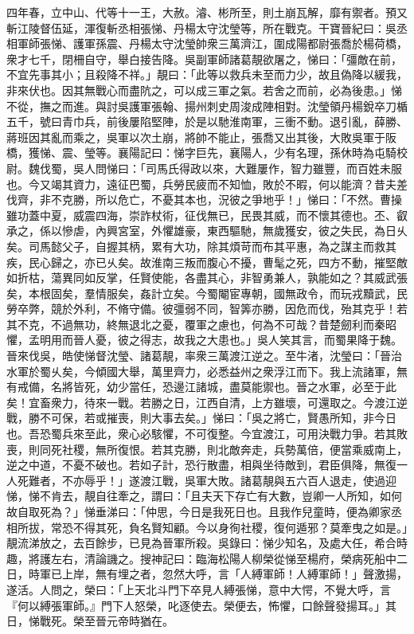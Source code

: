 \begin{pinyinscope}
四年春，立中山、代等十一王，大赦。濬、彬所至，則土崩瓦解，靡有禦者。預又斬江陵督伍延，渾復斬丞相張悌、丹楊太守沈瑩等，所在戰克。干寶晉紀曰：吳丞相軍師張悌、護軍孫震、丹楊太守沈瑩帥衆三萬濟江，圍成陽都尉張喬於楊荷橋，衆才七千，閉柵自守，舉白接告降。吳副軍師諸葛靚欲屠之，悌曰：「彊敵在前，不宜先事其小；且殺降不祥。」靚曰：「此等以救兵未至而力少，故且偽降以緩我，非來伏也。因其無戰心而盡阬之，可以成三軍之氣。若舍之而前，必為後患。」悌不從，撫之而進。與討吳護軍張翰、揚州刺史周浚成陣相對。沈瑩領丹楊銳卒刀楯五千，號曰青巾兵，前後屢陷堅陣，於是以馳淮南軍，三衝不動。退引亂，薛勝、蔣班因其亂而乘之，吳軍以次土崩，將帥不能止，張喬又出其後，大敗吳軍于阪橋，獲悌、震、瑩等。襄陽記曰：悌字巨先，襄陽人，少有名理，孫休時為屯騎校尉。魏伐蜀，吳人問悌曰：「司馬氏得政以來，大難屢作，智力雖豐，而百姓未服也。今又竭其資力，遠征巴蜀，兵勞民疲而不知恤，敗於不暇，何以能濟？昔夫差伐齊，非不克勝，所以危亡，不憂其本也，況彼之爭地乎！」悌曰：「不然。曹操雖功蓋中夏，威震四海，崇詐杖術，征伐無已，民畏其威，而不懷其德也。丕、叡承之，係以慘虐，內興宮室，外懼雄豪，東西驅馳，無歲獲安，彼之失民，為日乆矣。司馬懿父子，自握其柄，累有大功，除其煩苛而布其平惠，為之謀主而救其疾，民心歸之，亦已乆矣。故淮南三叛而腹心不擾，曹髦之死，四方不動，摧堅敵如折枯，蕩異同如反掌，任賢使能，各盡其心，非智勇兼人，孰能如之？其威武張矣，本根固矣，羣情服矣，姦計立矣。今蜀閹宦專朝，國無政令，而玩戎黷武，民勞卒弊，競於外利，不脩守備。彼彊弱不同，智筭亦勝，因危而伐，殆其克乎！若其不克，不過無功，終無退北之憂，覆軍之慮也，何為不可哉？昔楚劒利而秦昭懼，孟明用而晉人憂，彼之得志，故我之大患也。」吳人笑其言，而蜀果降于魏。晉來伐吳，皓使悌督沈瑩、諸葛靚，率衆三萬渡江逆之。至牛渚，沈瑩曰：「晉治水軍於蜀乆矣，今傾國大舉，萬里齊力，必悉益州之衆浮江而下。我上流諸軍，無有戒備，名將皆死，幼少當任，恐邊江諸城，盡莫能禦也。晉之水軍，必至于此矣！宜畜衆力，待來一戰。若勝之日，江西自清，上方雖壞，可還取之。今渡江逆戰，勝不可保，若或摧喪，則大事去矣。」悌曰：「吳之將亡，賢愚所知，非今日也。吾恐蜀兵來至此，衆心必駭懼，不可復整。今宜渡江，可用決戰力爭。若其敗喪，則同死社稷，無所復恨。若其克勝，則北敵奔走，兵勢萬倍，便當乘威南上，逆之中道，不憂不破也。若如子計，恐行散盡，相與坐待敵到，君臣俱降，無復一人死難者，不亦辱乎！」遂渡江戰，吳軍大敗。諸葛靚與五六百人退走，使過迎悌，悌不肯去，靚自往牽之，謂曰：「且夫天下存亡有大數，豈卿一人所知，如何故自取死為？」悌垂涕曰：「仲思，今日是我死日也。且我作兒童時，便為卿家丞相所拔，常恐不得其死，負名賢知顧。今以身徇社稷，復何遁邪？莫牽曳之如是。」靚流涕放之，去百餘步，已見為晉軍所殺。吳錄曰：悌少知名，及處大任，希合時趣，將護左右，清論譏之。搜神記曰：臨海松陽人柳榮從悌至楊府，榮病死船中二日，時軍已上岸，無有埋之者，忽然大呼，言「人縛軍師！人縛軍師！」聲激揚，遂活。人問之，榮曰：「上天北斗門下卒見人縛張悌，意中大愕，不覺大呼，言『何以縛張軍師。』門下人怒榮，叱逐使去。榮便去，怖懼，口餘聲發揚耳。」其日，悌戰死。榮至晉元帝時猶在。


\end{pinyinscope}
